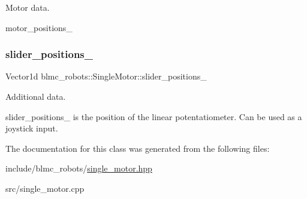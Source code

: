 Motor data. 

motor\+\_\+positions\+\_\+ \mbox{\label{classblmc__robots_1_1SingleMotor_a15774ca374fff212abe4d2b397263dc9}} 
\subsubsection{\texorpdfstring{slider\+\_\+positions\+\_\+}{slider\_positions\_}}
{\footnotesize\ttfamily Vector1d blmc\+\_\+robots\+::\+Single\+Motor\+::slider\+\_\+positions\+\_\+\hspace{0.3cm}{\ttfamily [private]}}



Additional data. 

slider\+\_\+positions\+\_\+ is the position of the linear potentatiometer. Can be used as a joystick input. 

The documentation for this class was generated from the following files\+:\begin{DoxyCompactItemize}
\item 
include/blmc\+\_\+robots/\hyperlink{single__motor_8hpp}{single\+\_\+motor.\+hpp}\item 
src/single\+\_\+motor.\+cpp\end{DoxyCompactItemize}
